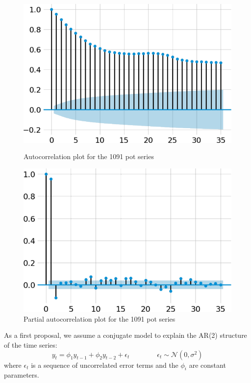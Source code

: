 \documentclass{article}
\begin{document}
  \begin{figure}[h!]
    \centering
    \begin{minipage}[t]{0.4\textwidth}
      \centering
      \includegraphics[scale=0.3]{acf.png}
      \caption{Autocorrelation plot for the 1091 pot series}\label{fig:acf}
    \end{minipage}\hfill
    \begin{minipage}[t]{0.4\textwidth}
      \centering
      \includegraphics[scale=0.3]{pacf.png}
      \caption{Partial autocorrelation plot for the 1091 pot series}\label{fig:pacf}
    \end{minipage}
  \end{figure}

As a first proposal, we assume a conjugate model to explain the AR(2) structure of the time series:
\begin{equation*}
    y_t = \phi_1 y_{t-1} + \phi_2 y_{t-2} + \epsilon_{t} \qquad \qquad \epsilon_{t} \sim \mathcal{N}(0, \sigma^2) 
\end{equation*}
where $\epsilon_{t}$ is a sequence of uncorrelated error terms and the $\phi_i$ are constant parameters.
\end{document}
